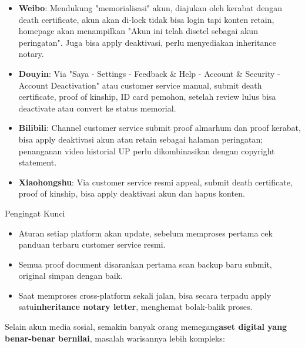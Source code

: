 \begin{itemize}
  \item \textbf{Weibo}: Mendukung "memorialisasi" akun, diajukan oleh kerabat dengan death certificate, akun akan di-lock tidak bisa login tapi konten retain, homepage akan menampilkan "Akun ini telah disetel sebagai akun peringatan". Juga bisa apply deaktivasi, perlu menyediakan inheritance notary.
  \item \textbf{Douyin}: Via "Saya - Settings - Feedback \& Help - Account \& Security - Account Deactivation" atau customer service manual, submit death certificate, proof of kinship, ID card pemohon, setelah review lulus bisa deactivate atau convert ke status memorial.
  \item \textbf{Bilibili}: Channel customer service submit proof almarhum dan proof kerabat, bisa apply deaktivasi akun atau retain sebagai halaman peringatan; penanganan video historial UP perlu dikombinasikan dengan copyright statement.
  \item \textbf{Xiaohongshu}: Via customer service resmi appeal, submit death certificate, proof of kinship, bisa apply deaktivasi akun dan hapus konten.
\end{itemize}

\begin{tcbinfo}{Pengingat Kunci}
\begin{itemize}
  \item Aturan setiap platform akan update, sebelum memproses pertama cek panduan terbaru customer service resmi.
  \item Semua proof document disarankan pertama scan backup baru submit, original simpan dengan baik.
  \item Saat memproses cross-platform sekali jalan, bisa secara terpadu apply satu\textbf{inheritance notary letter}, menghemat bolak-balik proses.
\end{itemize}

\end{tcbinfo}


Selain akun media sosial, semakin banyak orang memegang\textbf{aset digital yang benar-benar bernilai}, masalah warisannya lebih kompleks:


